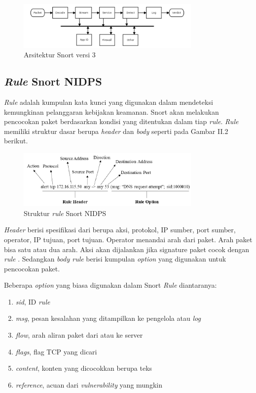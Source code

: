       \begin{figure}[htb]
        \centering
        \includegraphics[width=0.8\textwidth]{resources/snort3.png}
        \caption[Arsitektur Snort versi 3]{Arsitektur Snort versi 3}
      \end{figure}


  \subsection{\emph{Rule} Snort NIDPS}

  \emph{Rule} adalah kumpulan kata kunci yang digunakan dalam mendeteksi kemungkinan pelanggaran kebijakan keamanan. Snort akan melakukan pencocokan paket berdasarkan kondisi yang ditentukan dalam tiap \emph{rule}. \emph{Rule} memiliki struktur dasar berupa \emph{header} dan \emph{body} seperti pada Gambar II.2 berikut. 
  
      \begin{figure}[htb]
        \centering
        \includegraphics[width=0.8\textwidth]{resources/rule.png}
        \caption[Struktur \emph{rule} Snort NIDPS]{Struktur \emph{rule} Snort NIDPS}
      \end{figure}
  

    \emph{Header} berisi spesifikasi dari berupa aksi, protokol, IP sumber, port sumber, operator, IP tujuan, port tujuan. Operator menandai arah dari paket. Arah paket bisa satu atau dua arah. Aksi akan dijalankan jika signature paket cocok dengan \emph{rule} \citep{5358130}. Sedangkan \emph{body rule} berisi kumpulan \emph{option} yang digunakan untuk pencocokan paket. 

    Beberapa \emph{option} yang biasa digunakan dalam Snort \emph{Rule} diantaranya:
    \begin{enumerate} 
      \item \emph{sid}, ID \emph{rule}
      \item \emph{msg}, pesan kesalahan yang ditampilkan ke pengelola atau \emph{log}
      \item \emph{flow}, arah aliran paket dari atau ke server
      \item \emph{flags}, flag TCP yang dicari
      \item \emph{content}, konten yang dicocokkan berupa teks
      \item \emph{reference}, acuan dari \emph{vulnerability} yang mungkin
    \end{enumerate} 

